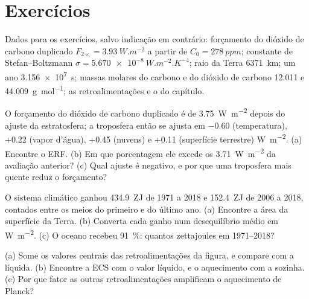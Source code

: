 \section*{Exercícios}\label{sec:b2:anthropogenic-climate-change:exercises}

Dados para os exercícios, salvo indicação em contrário: forçamento do dióxido de carbono duplicado $F_{2\times} =
\qty{3.93}{W.m^{-2}}$ a partir de $C_0 = \qty{278}{ppm}$; constante de Stefan--Boltzmann $\sigma =
\qty{5.670e-8}{W.m^{-2}.K^{-4}}$; raio da Terra \qty{6371}{km}; um ano
\qty{3.156e7}{s}; massas molares do carbono e do dióxido de carbono 12.011 e \qty{44.009}{g.mol^{-1}};
as retroalimentações e o  do capítulo.

\begin{exercise}[$\star$]\label{exo:b2:anthropogenic-climate-change:1}
O forçamento do dióxido de carbono duplicado é de \qty{3.75}{W.m^{-2}} depois do ajuste da estratosfera;
a troposfera então se ajusta em $-0.60$ (temperatura), +0.22 (vapor d'água), +0.45 (nuvens) e
+0.11 (superfície terrestre) \unit{W.m^{-2}}. (a) Encontre o ERF. (b) Em que porcentagem ele excede os
\qty{3.71}{W.m^{-2}} da avaliação anterior? (c) Qual ajuste é negativo, e por que uma troposfera mais quente
reduz o forçamento?
\end{exercise}

\begin{exercise}[$\star$]\label{exo:b2:anthropogenic-climate-change:2}
O sistema climático ganhou \qty{434.9}{ZJ} de 1971 a 2018 e \qty{152.4}{ZJ} de 2006 a 2018,
contados entre os meios do primeiro e do último ano. (a) Encontre a área da superfície da Terra.
(b) Converta cada ganho num desequilíbrio médio em \unit{W.m^{-2}}. (c) O oceano recebeu
\qty{91}{\percent}: quantos zettajoules em 1971--2018?
\end{exercise}

\begin{exercise}[$\star$]\label{exo:b2:anthropogenic-climate-change:3}
(a) Some os valores centrais das retroalimentações da figura, e compare com a líquida. (b) Encontre
a ECS com o valor líquido, e o aquecimento com a  sozinha. (c) Por que fator
as outras retroalimentações amplificam o aquecimento de Planck?
\end{exercise}

